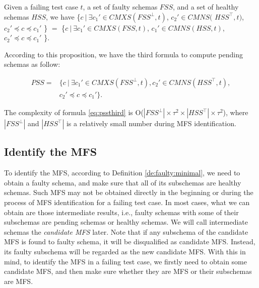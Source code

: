 \documentclass{sig-alternate-05-2015}
\begin{document}
{{\begin{proposition}\label{pro:identicialPending}
Given a failing test case $t$, a set of faulty schemas $FSS$, and a set of healthy schemas $HSS$, we have \{$ c\ |\ \exists c_{1}' \in CMXS(FSS^{\bot}, t)$, $ c_{2}' \in CMNS($ $HSS^{\top}, t)$, $c_{2}' \preceq c \preceq c_{1}'$ \} $=$  \{$ c\ |\ \exists c_{1}' \in CMXS(FSS, t)$, $c_{1}' \in CMNS(HSS, t)$, $c_{2}' \preceq c \preceq c_{1}'$ \}.
\end{proposition}

According to this proposition, we have the third formula to compute pending schemas as follow:

\begin{equation}\label{eq:pssthird}
\begin{aligned}
PSS = & \{ c\ |\ \exists c_{1}' \in CMXS(FSS^{\bot}, t), c_{2}' \in CMNS(HSS^{\top}, t), \\
    & c_{2}' \preceq c \preceq c_{1}' \}.
\end{aligned}
\end{equation}

The complexity of formula \ref{eq:pssthird} is O($|FSS^{\bot}|\times \tau^{2} \times |HSS^{\top}|\times \tau^{2}$), where $|FSS^{\bot}|$ and $|HSS^{\top}|$ is a relatively small number during MFS identification.



\subsection{Identify the MFS}
To identify the MFS, according to Definition \ref{de:faulty:minimal}, we need to obtain a faulty schema, and make sure that all of its subschemas are healthy schemas. Such MFS may not be obtained directly in the beginning or during the process of MFS identification for a failing test case. In most cases, what we can obtain are those intermediate results, i.e., faulty schemas with some of their subschemas are pending schemas or healthy schemas. We will call intermediate schemas the \emph{candidate MFS} later. Note that if any subschema of the candidate MFS is found to faulty schema, it will be disqualified as candidate MFS. Instead, its faulty subschema will be regarded as the new candidate MFS. With this in mind, to identify the MFS in a failing test case, we firstly need to obtain some candidate MFS, and then make sure whether they are MFS or their subschemas are MFS.

}}
\end{document}
